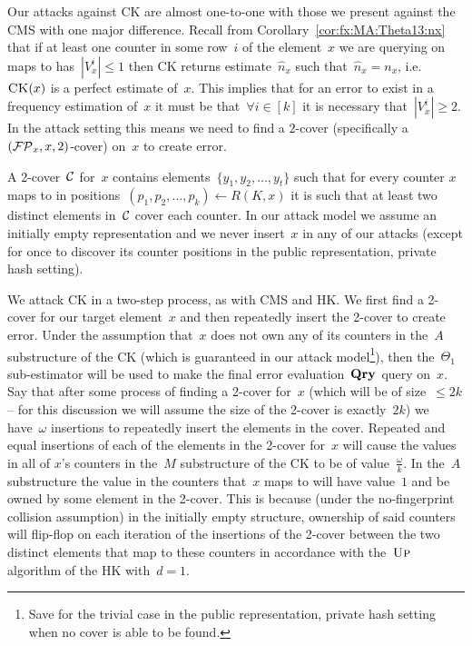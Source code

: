 Our attacks against CK are almost one-to-one with those we present against the CMS with one major difference. Recall from Corollary~\ref{cor:fx:MA:Theta13:nx} that if at least one counter in some row~$i$ of the element~$x$ we are querying on maps to has~$|V^i_x| \leq 1$ then CK returns estimate~$\hat{n}_x$ such that~$\hat{n}_x = n_x$, i.e. $\textnormal{\textsc{CK}}(x)$ is a perfect estimate of~$x$. This implies that for an error to exist in a frequency estimation of~$x$ it must be that~$\forall i \in [k]$ it is necessary that~$|V^i_x| \geq 2$. In the attack setting this means we need to find a $2$-cover (specifically a~$(\mathcal{FP}_{x},x,2)$-cover) on~$x$ to create error.

A 2-cover~$\mathcal{C}$ for~$x$ contains elements~$\{y_1,y_2,\ldots,y_t\}$ such that for every counter $x$ maps to in positions~$(p_1,p_2,\ldots,p_k) \gets R(K,x)$ it is such that at least two distinct elements in~$\mathcal{C}$ cover each counter. In our attack model we assume an initially empty representation and we never insert~$x$ in any of our attacks (except for once to discover its counter positions in the public representation, private hash setting). 

We attack CK in a two-step process, as with CMS and HK. We first find a 2-cover for our target element~$x$ and then repeatedly insert the 2-cover to create error. Under the assumption that~$x$ does not own any of its counters in the~$A$ substructure of the CK (which is guaranteed in our attack model\footnote{Save for the trivial case in the public representation, private hash setting when no cover is able to be found.}), then the~$\Theta_1$ sub-estimator will be used to make the final error evaluation~$\textup{\textbf{Qry}}\hspace{0.5pt}$ query on~$x$. Say that after some process of finding a 2-cover for~$x$ (which will be of size~$\leq 2k$ -- for this discussion we will assume the size of the 2-cover is exactly~$2k$) we have~$\omega$ insertions to repeatedly insert the elements in the cover. Repeated and equal insertions of each of the elements in the 2-cover for~$x$ will cause the values in all of $x$'s counters in the~$M$ substructure of the CK to be of value~$\frac{\omega}{k}$. In the~$A$ substructure the value in the counters that~$x$ maps to will have value~$1$ and be owned by some element in the 2-cover. This is because (under the no-fingerprint collision assumption) in the initially empty structure, ownership of said counters will flip-flop on each iteration of the insertions of the 2-cover between the two distinct elements that map to these counters in accordance with the~$\textnormal{\textsc{Up}}$ algorithm of the HK with~$d=1$. 

